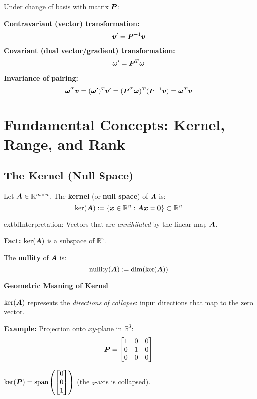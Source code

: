 \begin{definition}
    Under change of basis with matrix $\bm{P}$:

    \textbf{Contravariant (vector) transformation:}
    \[
        \bm{v}' = \bm{P}^{-1} \bm{v}
    \]

    \textbf{Covariant (dual vector/gradient) transformation:}
    \[
        \bm{\omega}' = \bm{P}^T \bm{\omega}
    \]

    \textbf{Invariance of pairing:}
    \[
        \bm{\omega}^T \bm{v} = (\bm{\omega}')^T \bm{v}' = (\bm{P}^T\bm{\omega})^T (\bm{P}^{-1}\bm{v}) = \bm{\omega}^T \bm{v}
    \]
\end{definition}

\section{Fundamental Concepts: Kernel, Range, and Rank}

\subsection{The Kernel (Null Space)}

\begin{definition}
    \label{def:kernel}
    Let $\bm{A} \in \mathbb{R}^{m \times n}$. The \textbf{kernel} (or \textbf{null space}) of $\bm{A}$ is:
    \[
        \ker(\bm{A}) := \{\bm{x} \in \mathbb{R}^n : \bm{A}\bm{x} = \bm{0}\} \subset \mathbb{R}^n
    \]

    	extbf{Interpretation:} Vectors that are \emph{annihilated} by the linear map $\bm{A}$.

    \textbf{Fact:} $\ker(\bm{A})$ is a subspace of $\mathbb{R}^n$.
\end{definition}

\begin{definition}[Nullity]
    The \textbf{nullity} of $\bm{A}$ is:
    \[
        \text{nullity}(\bm{A}) := \dim(\ker(\bm{A}))
    \]
\end{definition}

\begin{intuitionbox}
    \textbf{Geometric Meaning of Kernel}

    $\ker(\bm{A})$ represents the \emph{directions of collapse}: input directions that map to the zero vector.

    \textbf{Example:} Projection onto $xy$-plane in $\mathbb{R}^3$:
    \[
        \bm{P} = \begin{bmatrix} 1 & 0 & 0 \\ 0 & 1 & 0 \\ 0 & 0 & 0 \end{bmatrix}
    \]

    $\ker(\bm{P}) = \text{span}\left(\begin{bmatrix} 0 \\ 0 \\ 1 \end{bmatrix}\right)$ (the $z$-axis is collapsed).
\end{intuitionbox}


